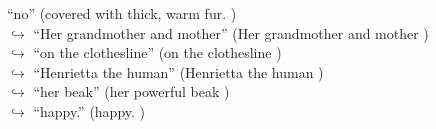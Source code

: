 \documentclass[11pt,a4paper, onecolumn]{article}
\begin{document}
\begin{figure}[t]
\begin{tcolorbox}[boxsep=0pt,left=5pt,right=0pt,top=2pt,colback = yellow!5]
\begin{dialogue}
{ ``no'' (covered with thick, warm fur. ) }
\\
\colorbox{pink!25}{$\hookrightarrow$}
{ ``Her grandmother and mother'' (Her grandmother and mother ) }
\\
\colorbox{pink!25}{$\hookrightarrow$}
{ ``on the clothesline'' (on the clothesline ) }
\\
\colorbox{pink!25}{$\hookrightarrow$}
{ ``Henrietta the human'' (Henrietta the human ) }
\\
\colorbox{pink!25}{$\hookrightarrow$}
{ ``her beak'' (her powerful beak ) }
\\
\colorbox{pink!25}{$\hookrightarrow$}
{ ``happy.'' (happy. ) }
 \end{dialogue}\end{tcolorbox}\end{figure}
\end{document}
